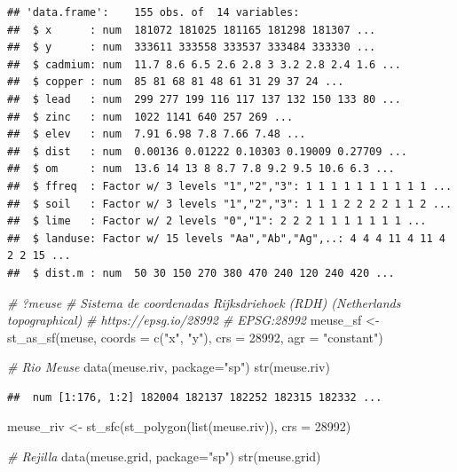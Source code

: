 \documentclass[
  spanish,
]{book}
\newenvironment{Shaded}{\begin{snugshade}}{\end{snugshade}}
\newcommand{\AttributeTok}[1]{\textcolor[rgb]{0.77,0.63,0.00}{#1}}
\newcommand{\CommentTok}[1]{\textcolor[rgb]{0.56,0.35,0.01}{\textit{#1}}}
\newcommand{\DecValTok}[1]{\textcolor[rgb]{0.00,0.00,0.81}{#1}}
\newcommand{\FunctionTok}[1]{\textcolor[rgb]{0.00,0.00,0.00}{#1}}
\newcommand{\NormalTok}[1]{#1}
\newcommand{\OtherTok}[1]{\textcolor[rgb]{0.56,0.35,0.01}{#1}}
\newcommand{\StringTok}[1]{\textcolor[rgb]{0.31,0.60,0.02}{#1}}
\theoremstyle{break}
\theoremstyle{definition}
\theoremstyle{definition}
\theoremstyle{definition}
\theoremstyle{definition}
\theoremstyle{remark}
\begin{document}
\begin{verbatim}
## 'data.frame':    155 obs. of  14 variables:
##  $ x      : num  181072 181025 181165 181298 181307 ...
##  $ y      : num  333611 333558 333537 333484 333330 ...
##  $ cadmium: num  11.7 8.6 6.5 2.6 2.8 3 3.2 2.8 2.4 1.6 ...
##  $ copper : num  85 81 68 81 48 61 31 29 37 24 ...
##  $ lead   : num  299 277 199 116 117 137 132 150 133 80 ...
##  $ zinc   : num  1022 1141 640 257 269 ...
##  $ elev   : num  7.91 6.98 7.8 7.66 7.48 ...
##  $ dist   : num  0.00136 0.01222 0.10303 0.19009 0.27709 ...
##  $ om     : num  13.6 14 13 8 8.7 7.8 9.2 9.5 10.6 6.3 ...
##  $ ffreq  : Factor w/ 3 levels "1","2","3": 1 1 1 1 1 1 1 1 1 1 ...
##  $ soil   : Factor w/ 3 levels "1","2","3": 1 1 1 2 2 2 2 1 1 2 ...
##  $ lime   : Factor w/ 2 levels "0","1": 2 2 2 1 1 1 1 1 1 1 ...
##  $ landuse: Factor w/ 15 levels "Aa","Ab","Ag",..: 4 4 4 11 4 11 4 2 2 15 ...
##  $ dist.m : num  50 30 150 270 380 470 240 120 240 420 ...
\end{verbatim}

\begin{Shaded}
\begin{Highlighting}[]
\CommentTok{\# ?meuse }
\CommentTok{\# Sistema de coordenadas Rijksdriehoek (RDH) (Netherlands topographical) }
\CommentTok{\# https://epsg.io/28992 \# EPSG:28992}
\NormalTok{meuse\_sf }\OtherTok{\textless{}{-}} \FunctionTok{st\_as\_sf}\NormalTok{(meuse, }\AttributeTok{coords =} \FunctionTok{c}\NormalTok{(}\StringTok{"x"}\NormalTok{, }\StringTok{"y"}\NormalTok{), }\AttributeTok{crs =} \DecValTok{28992}\NormalTok{, }\AttributeTok{agr =} \StringTok{"constant"}\NormalTok{)}

\CommentTok{\# Rio Meuse }
\FunctionTok{data}\NormalTok{(meuse.riv, }\AttributeTok{package=}\StringTok{"sp"}\NormalTok{)}
\FunctionTok{str}\NormalTok{(meuse.riv)}
\end{Highlighting}
\end{Shaded}

\begin{verbatim}
##  num [1:176, 1:2] 182004 182137 182252 182315 182332 ...
\end{verbatim}

\begin{Shaded}
\begin{Highlighting}[]
\NormalTok{meuse\_riv }\OtherTok{\textless{}{-}} \FunctionTok{st\_sfc}\NormalTok{(}\FunctionTok{st\_polygon}\NormalTok{(}\FunctionTok{list}\NormalTok{(meuse.riv)), }\AttributeTok{crs =} \DecValTok{28992}\NormalTok{)}

\CommentTok{\# Rejilla}
\FunctionTok{data}\NormalTok{(meuse.grid, }\AttributeTok{package=}\StringTok{"sp"}\NormalTok{)}
\FunctionTok{str}\NormalTok{(meuse.grid)}
\end{Highlighting}
\end{Shaded}
\end{document}
